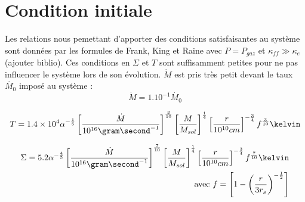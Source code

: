 \chapter*{Condition initiale}
Les relations nous pemettant d'apporter des conditions satisfaisantes au système sont données par les formules de Frank, King et Raine avec $P = P_{gaz}$ et $\kappa_{ff} \gg \kappa_{e}$(ajouter biblio). Ces conditions en $\Sigma$ et $T$ sont suffisamment petites pour ne pas influencer le système lors de son évolution. $\dot{M}$ est pris très petit devant  le taux $\dot{M_{0}}$ imposé au système : 
\begin{equation}
	\dot{M} = 1.10^{-1 }\dot{M_{0}}
\end{equation} 

\begin{equation}
	T = 1.4 \times 10^{4} \alpha^{- \frac{1}{5}} \left[ \frac{\dot{M}}{10^{16} \gram \second^{-1}} \right]^{\frac{3}{10}} \left[ \frac{M}{M_{sol}}\right]^{\frac{1}{4}} \left[ \frac{r}{10^{10} cm}\right]^{- \frac{3}{4}} f^{\frac{3}{10}} \kelvin 
\end{equation}

\begin{align}
	\Sigma = 5.2 \alpha^{- \frac{4}{5}} \left[ \frac{\dot{M}}{10^{16} \gram \second^{-1}} \right]^{\frac{7}{10}} \left[ \frac{M}{M_{sol}}\right]^{\frac{1}{4}} \left[ \frac{r}{10^{10} cm}\right]^{- \frac{3}{4}} f^{\frac{7}{10}} \kelvin  \\ 
	\text{avec } f = \left[ 1 - \left( \frac{r}{3 r_{s}}\right)^{- \frac{1}{2}}\right]
\end{align}

